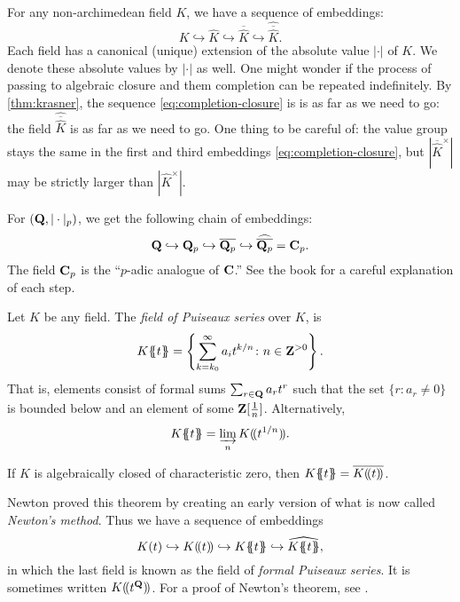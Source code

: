 For any non-archimedean field $K$, we have a sequence of embeddings:
\begin{equation}\label{eq:completion-closure}
  K \hookrightarrow 
  \widehat K \hookrightarrow 
  \overline{\widehat K} \hookrightarrow 
  \widehat{\overline{\widehat K}} .
\end{equation}
Each field has a canonical (unique) extension of the absolute value $|\cdot|$ 
of $K$. We denote these absolute values by $|\cdot|$ as well. One might wonder 
if the process of passing to algebraic closure and them completion can be 
repeated indefinitely. By \autoref{thm:krasner}, the sequence 
\eqref{eq:completion-closure} is is as far as we need to go: the field 
$\widehat{\overline{\widehat K}}$ is as far as we need to go. One thing to be 
careful of: the value group stays the same in the first and third embeddings 
\eqref{eq:completion-closure}, but 
$|\overline{\widehat K}^\times|$ may be strictly larger than 
$|\widehat K^\times|$. 

\begin{example}
For $(\mathbf{Q},|\cdot|_p)$, we get the following chain of embeddings:
\[
  \mathbf{Q}\hookrightarrow \mathbf{Q}_p \hookrightarrow \overline{\mathbf{Q}_p} \hookrightarrow \widehat{\overline{\mathbf{Q}_p}} = \mathbf{C}_p .
\]
The field $\mathbf{C}_p$ is the ``$p$-adic analogue of $\mathbf{C}$.'' See the book 
\cite{koblitz-1984} for a careful explanation of each step. 
\end{example}

\begin{definition}
Let $K$ be any field. The \emph{field of Puiseaux series} over $K$, is 
\[
  K\{\!\!\{t\}\!\!\} = \left\{\sum_{k=k_0}^\infty a_i t^{k/n}\colon n\in \mathbf{Z}^{>0}\right\} .
\]
That is, elements consist of formal sums $\sum_{r\in \mathbf{Q}} a_r t^r$ such that 
the set $\{r\colon a_r\ne 0\}$ is bounded below and an element of some 
$\mathbf{Z}[\frac 1 n]$. Alternatively, 
\[
  K\{\!\!\{t\}\!\!\} = \varinjlim_n K(\!( t^{1/n})\!) .
\]
\end{definition}

\begin{theorem}[Newton]
If $K$ is algebraically closed of characteristic zero, then 
$K\{\!\!\{t\}\!\!\} = \overline{K(\!( t)\!)}$. 
\end{theorem}

Newton proved this theorem by creating an early version of what is now called 
\emph{Newton's method}. Thus we have a sequence of embeddings 
\[
  K(t)\hookrightarrow 
  K\laurent{t} \hookrightarrow 
  K\puiseaux{t} \hookrightarrow 
  \widehat{K{\puiseaux{t}}} ,
\]
in which the last field is known as the field of \emph{formal Puiseaux 
series}. It is sometimes written $K(\!( t^{\mathbf{Q}})\!)$. For a proof of Newton's 
theorem, see \cite[Cor.~13.15]{eisenbud-1995}. 


